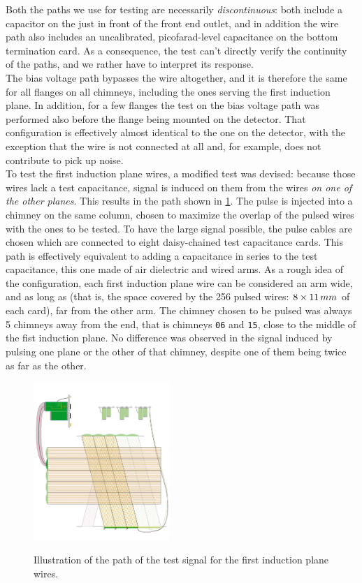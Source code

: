 Both the paths we use for testing are necessarily \emph{discontinuous}: both
include a  capacitor on the \DBB just in front of the front end
outlet, and in addition the wire path also includes an uncalibrated,
picofarad-level capacitance on the bottom termination card.
As a consequence, the test can't directly verify the continuity of the paths,
and we rather have to interpret its response.
\\
The bias voltage path bypasses the wire altogether, and it is therefore the same
for all flanges on all chimneys, including the ones serving the first induction
plane.
In addition, for a few flanges the test on the bias voltage path was performed
also before the flange being mounted on the detector.
That configuration is effectively almost identical to the one on the detector,
with the exception that the wire is not connected at all and, for example, does
not contribute to pick up noise.
\\
To test the first induction plane wires, a modified test was devised: because
those wires lack a test capacitance, signal is induced on them from the wires
\emph{on one of the other planes}. This results in the path shown in
\cref{fig:WireToReadoutInduced}. The pulse is injected into a chimney on the
same column, chosen to maximize the overlap of the pulsed wires with the ones
to be tested. To have the large signal possible, the pulse cables are chosen
which are connected to eight daisy-chained test capacitance cards.
This path is effectively equivalent to adding a capacitance in series to the
test capacitance, this one made of air dielectric and wired arms.
As a rough idea of the configuration, each first induction plane wire can be
considered an arm  wide, and as long as  (that is, the
space covered by the 256 pulsed wires: $8 \times 11\,mm$ of each card), far
 from the other arm. The chimney chosen to be pulsed was always 5 chimneys
away from the end, that is chimneys \texttt{06} and \texttt{15}, close to the
middle of the fist induction plane. No difference was observed in the signal
induced by pulsing one plane or the other of that chimney, despite one of them
being twice as far as the other.
\begin{figure}
  {
    \centering
    \includegraphics[height=6cm,clip,trim=0 30 0 0]{fig/PulseCableHorizontalPath}\\
  }
  \caption{\label{fig:WireToReadoutInduced}
    Illustration of the path of the test signal for the first induction plane
    wires.
  }
\end{figure}
